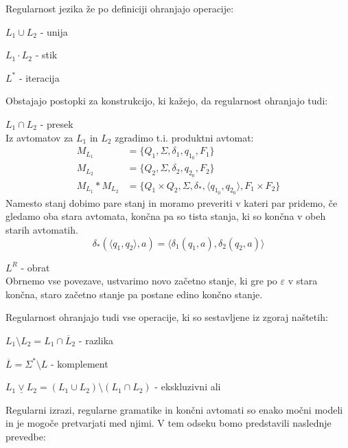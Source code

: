 \documentclass[10pt,a4paper,oneside]{book}
\begin{document}
Regularnost jezika že po definiciji ohranjajo operacije:
\begin{items}
\item $L_1 \cup L_2$ - unija 
\item $L_1 \cdot L_2$ - stik 
\item $L^*$ - iteracija
\end{items}
Obstajajo postopki za konstrukcijo, ki kažejo, da regularnost ohranjajo tudi:
\begin{items}
\item $L_1 \cap L_2$ - presek\\
	Iz avtomatov za $L_1$ in $L_2$ zgradimo t.i. produktni avtomat:
		\begin{align*}
			M_{L_1} &= \{ Q_1, \Sigma, \delta_1, q_{1_0}, F_1 \}\\
			M_{L_2} &= \{ Q_2, \Sigma, \delta_2, q_{2_0}, F_2 \}\\
			M_{L_1}*M_{L_2} &= \{ Q_1 \times Q_2, \Sigma, \delta_*, \langle q_{1_0}, q_{2_0} \rangle, F_1 \times F_2 \}
		\end{align*}
	Namesto stanj dobimo pare stanj in moramo preveriti v kateri par pridemo, če gledamo oba stara avtomata, končna pa so tista stanja, ki so končna v obeh starih avtomatih.
	\[ \delta_*(\langle q_1, q_2 \rangle, a) = \langle \delta_1(q_1, a), \delta_2(q_2, a)\rangle \]
\item $L^R$ - obrat\\
	Obrnemo vse povezave, ustvarimo novo začetno stanje, ki gre po $\varepsilon$ v stara končna, staro začetno stanje pa postane edino končno stanje.
\end{items}
Regularnost ohranjajo tudi vse operacije, ki so sestavljene iz zgoraj naštetih:
\begin{items}
\item $L_1 \setminus L_2 = L_1 \cap \overline L_2$ - razlika
\item $\overline{L} = \Sigma^* \setminus L$ - komplement
\item $L_1 \underline\vee L_2 = (L_1 \cup L_2) \setminus (L_1 \cap L_2)$ - ekskluzivni ali 
\end{items}

Regularni izrazi, regularne gramatike in končni avtomati so enako močni modeli in je mogoče pretvarjati med njimi. V tem odseku bomo predstavili naslednje prevedbe:\\[12pt]%
\begin{center}
\end{center}
\end{document}

